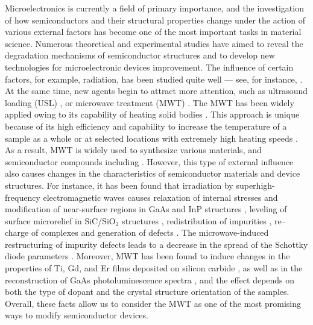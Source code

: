 \documentclass[10pt]{iopart}
\begin{document}
Microelectronics is currently a field of primary importance, and  the investigation of how semiconductors and their structural properties change under the action of various external factors has become one of the most important tasks in material science.
Numerous theoretical and experimental studies have aimed to reveal the degradation mechanisms of 
semiconductor structures and to develop new technologies for microelectronic devices improvement.
The influence of certain factors, for example, radiation, has been studied quite well --- see, for instance, \cite{KozlovsEn,RadiationEffectsBook,DefByIon}.
At the same time, new agents begin to attract more attention, such as ultrasound loading (USL) \cite{Olikh2018JAP,Olikh2006TPL},
or microwave treatment (MWT) \cite{MW:Rev,ZOHM2000,BHUNIA1998,Bacherikov2003En,Pashkov1994En,
BoltovetsEn,Milenin1994En,BelyaevIntac,ASHKINADZE1996,ProcSPIE,Belyaev1998JTFEn,
Bacherikov2008En,Konakova2015En,Konakova2012FTPEn}.
The MWT has been widely applied owing to its capability of heating solid bodies \cite{MW:Rev,ZOHM2000}.
This approach is unique because of its high efficiency and capability to increase the temperature
of a sample as a whole or at selected locations with extremely high heating speeds \cite{MW:Rev}.
As a result, MWT is widely used to synthesize various materials, 
and semiconductor compounds including \cite{MW:Rev,BHUNIA1998}.
However, this type of external influence also causes changes in the  characteristics of semiconductor materials and device structures.
For instance, it has been found that irradiation by superhigh-frequency electromagnetic waves causes relaxation of internal stresses and modification of near-surface regions
in GaAs and InP structures \cite{BoltovetsEn,Pashkov1994En,Milenin1994En,BelyaevIntac,ProcSPIE,Konakova2015En,Konakova2012FTPEn},
leveling of surface microrelief in SiC/SiO$_2$ structures \cite{Bacherikov2003En},
redistribution of impurities \cite{Bacherikov2003En,Belyaev1998JTFEn,Konakova2015En},
re--charge of complexes \cite{Milenin1994En}
and generation of defects \cite{Belyaev1998JTFEn}.
The microwave-induced restructuring of impurity defects leads to 
a decrease in the spread of the Schottky diode parameters \cite{Milenin1994En,Belyaev1998JTFEn}.
Moreover, MWT has been found to induce changes in the properties of Ti, Gd, and Er films deposited on silicon carbide \cite{Bacherikov2008En},
as well as in the reconstruction of GaAs photoluminescence spectra \cite{BelyaevIntac,ProcSPIE,Belyaev1998JTFEn},
and the effect depends on both the type of dopant and the crystal structure orientation of the samples.
Overall, these facts allow us to consider the MWT as one of the most promising ways to modify semiconductor devices.
\end{document}
